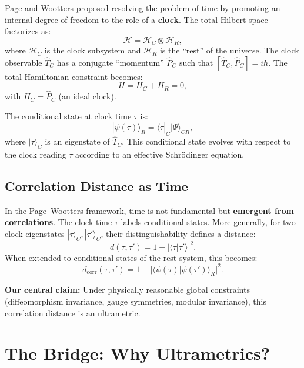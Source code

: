 \documentclass[12pt,a4paper]{article}
\theoremstyle{definition}
\newcommand{\cH}{\mathcal{H}}
\newcommand{\abs}[1]{\lvert#1\rvert}
\newcommand{\ket}[1]{|#1\rangle}
\newcommand{\bra}[1]{\langle #1|}
\newcommand{\braket}[2]{\langle #1 | #2 \rangle}
\begin{document}
Page and Wootters \cite{page1983wootters,wootters1984time} proposed resolving the problem of time by promoting an internal degree of freedom to the role of a \textbf{clock}. The total Hilbert space factorizes as:
\begin{equation}
\cH = \cH_C \otimes \cH_R,
\end{equation}
where $\cH_C$ is the clock subsystem and $\cH_R$ is the ``rest'' of the universe. The clock observable $\hat{T}_C$ has a conjugate ``momentum'' $\hat{P}_C$ such that $[\hat{T}_C, \hat{P}_C] = i\hbar$. The total Hamiltonian constraint becomes:
\begin{equation}
H = H_C + H_R = 0,
\end{equation}
with $H_C = \hat{P}_C$ (an ideal clock).

The conditional state at clock time $\tau$ is:
\begin{equation}
\ket{\psi(\tau)}_R = \bra{\tau}_C \ket{\Psi}_{CR},
\end{equation}
where $\ket{\tau}_C$ is an eigenstate of $\hat{T}_C$. This conditional state evolves with respect to the clock reading $\tau$ according to an effective Schr\"odinger equation.

\subsection{Correlation Distance as Time}

In the Page--Wootters framework, time is not fundamental but \textbf{emergent from correlations}. The clock time $\tau$ labels conditional states. More generally, for two clock eigenstates $\ket{\tau}_C, \ket{\tau'}_C$, their distinguishability defines a distance:
\begin{equation}
d(\tau, \tau') = 1 - \abs{\braket{\tau}{\tau'}}^2.
\end{equation}
When extended to conditional states of the rest system, this becomes:
\begin{equation}
d_{\text{corr}}(\tau, \tau') = 1 - \abs{\braket{\psi(\tau)}{\psi(\tau')}_R}^2.
\end{equation}

\textbf{Our central claim:} Under physically reasonable global constraints (diffeomorphism invariance, gauge symmetries, modular invariance), this correlation distance is an ultrametric.

\section{The Bridge: Why Ultrametrics?}
\end{document}

